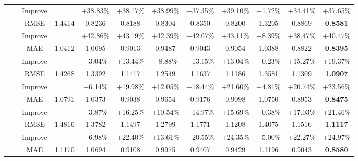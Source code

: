 \begin{table}[t]
{\begin{tabular}{|c|c|c||c|c|c|c|c|c||c|c||c|}
\multirow{16}{*}{} &\multirow{4}{*}{}& {Improve} & {} & {+38.83\%} & {+38.17\%} & {+38.99\%} & {+37.35\%}  & {+39.10\%} & {+1.72\%} &{+34.41\%} & {+37.65\%} \\
\cline{3-12}
\multirow{16}{*}{} &\multirow{4}{*}{}& {RMSE}    & {1.4414} & {0.8236}   &{0.8188} & {0.8304}   & {0.8350}   &  {0.8200}   & {1.3205}   & {0.8869} &{\textbf{0.8581}} \\
\multirow{16}{*}{} &\multirow{4}{*}{}& {Improve} & {} & {+42.86\%} & {+43.19\%} & {+42.39\%} & {+42.07\%}  & {+43.11\%} & {+8.39\%} &{+38.47\%} & {+40.47\%} \\
\hline
\hline
\multirow{16}{*}{Yelp}& \multirow{4}{*}{90\%} & {MAE} & {1.0412} & {1.0095}   &{0.9013} & {0.9487}   & {0.9043}   &  {0.9054}    & {1.0388}   & {0.8822} &{\textbf{0.8395}} \\
\multirow{16}{*}{} &\multirow{4}{*}{}& {Improve} & {} & {+3.04\%} & {+13.44\%} & {+8.88\%} & {+13.15\%}  & {+13.04\%} & {+0.23\%} &{+15.27\%} & {+19.37\%} \\
\cline{3-12}
\multirow{16}{*}{} &\multirow{4}{*}{}& {RMSE}             & {1.4268} & {1.3392}   &{1.1417} & {1.2549}   & {1.1637}   &  {1.1186}    & {1.3581}  & {1.1309}  &{\textbf{1.0907}}\\
\multirow{16}{*}{} &\multirow{4}{*}{}& {Improve} & {} & {+6.14\%} & {+19.98\%} & {+12.05\%} & {+18.44\%}  & {+21.60\%} & {+4.81\%} &{+20.74\%} & {+23.56\%} \\
\cline{2-12}
\multirow{16}{*}{} &\multirow{4}{*}{}\multirow{4}{*}{80\%} & {MAE} & {1.0791} & {1.0373}   &{0.9038} & {0.9654}   & {0.9176}   &  {0.9098}   & {1.0750}   & {0.8953}  &{\textbf{0.8475}} \\
\multirow{16}{*}{} &\multirow{4}{*}{}& {Improve} & {} & {+3.87\%} & {+16.25\%} & {+10.54\%} & {+14.97\%}  & {+15.69\%} & {+0.38\%} &{+17.03\%} & {+21.46\%} \\
\cline{3-12}
\multirow{16}{*}{} &\multirow{4}{*}{}& {RMSE}    & {1.4816} & {1.3782}   &{1.1497} & {1.2799}   & {1.1771}   &  {1.1208}   & {1.4075}   & {1.1516} &{\textbf{1.1117}}\\
\multirow{16}{*}{} &\multirow{4}{*}{}& {Improve} & {} & {+6.98\%} & {+22.40\%} & {+13.61\%} & {+20.55\%}  & {+24.35\%} & {+5.00\%} &{+22.27\%} & {+24.97\%} \\
\cline{2-12}
\multirow{16}{*}{} &\multirow{4}{*}{}\multirow{4}{*}{70\%} & {MAE} & {1.1170} & {1.0694}   &{0.9108} & {0.9975}   & {0.9407}   &  {0.9429}   & {1.1196}  & {0.9043} &{\textbf{0.8580}}\\

\end{tabular}}
\end{table}
